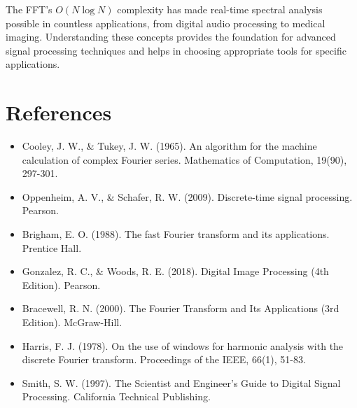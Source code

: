 \documentclass[11pt,a4paper]{article}
\begin{document}
The FFT's $O(N \log N)$ complexity has made real-time spectral analysis possible in countless applications, from digital audio processing to medical imaging. Understanding these concepts provides the foundation for advanced signal processing techniques and helps in choosing appropriate tools for specific applications.

\section{References}

\begin{itemize}
    \item Cooley, J. W., \& Tukey, J. W. (1965). An algorithm for the machine calculation of complex Fourier series. Mathematics of Computation, 19(90), 297-301.
    \item Oppenheim, A. V., \& Schafer, R. W. (2009). Discrete-time signal processing. Pearson.
    \item Brigham, E. O. (1988). The fast Fourier transform and its applications. Prentice Hall.
    \item Gonzalez, R. C., \& Woods, R. E. (2018). Digital Image Processing (4th Edition). Pearson.
    \item Bracewell, R. N. (2000). The Fourier Transform and Its Applications (3rd Edition). McGraw-Hill.
    \item Harris, F. J. (1978). On the use of windows for harmonic analysis with the discrete Fourier transform. Proceedings of the IEEE, 66(1), 51-83.
    \item Smith, S. W. (1997). The Scientist and Engineer's Guide to Digital Signal Processing. California Technical Publishing.
\end{itemize}
\end{document}
